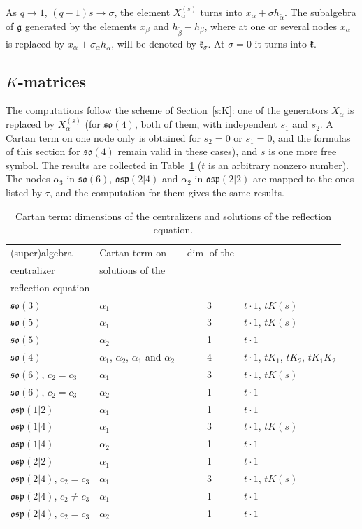 \documentclass[12pt,a4paper]{article}
\makeatletter
\newcommand{\g}{\mathfrak{g}}
\newcommand{\kk}{\mathfrak{k}}
\newcommand{\so}{\mathfrak{so}}
\newcommand{\osp}{\mathfrak{osp}}
\newcommand{\ta}{\tilde\alpha}
\newcommand{\hd}[2][c]{\tabular[b]{@{}#1@{}}#2\endtabular}
\makeatother
\begin{document}
As $q\to1$, $(q-1)s\to\sigma$, the element $X^{(s)}_\alpha$ turns into $x_\alpha+\sigma h_{\ta}$. The subalgebra of $\g$
generated by the elements $x_\beta$ and $h_{\tilde\beta}-h_\beta$, where at one or several nodes $x_\alpha$
is replaced by $x_\alpha+\sigma_\alpha h_{\ta}$, will be denoted by $\kk_\sigma$. At $\sigma=0$ it turns into $\kk$.


\subsection{$K$-matrices}\label{ss:Ks}
The computations follow the scheme of Section~\ref{s:K}: one of the generators $X_\alpha$ is replaced by $X^{(s)}_\alpha$ (for
$\so(4)$, both of them, with independent $s_1$ and $s_2$. A Cartan term on one node only is obtained for $s_2=0$ or $s_1=0$, and the formulas of this section for $\so(4)$ remain valid in these cases), and $s$ is one more free symbol. The results are collected in
Table~\ref{t:resS} ($t$ is an arbitrary nonzero number). The nodes $\alpha_3$ in $\so(6)$, $\osp(2|4)$ and $\alpha_2$ in $\osp(2|2)$ are mapped to the ones listed by
$\tau$, and the computation for them gives the same results.

\begin{table}[H]
\centering\small
\setlength{\tabcolsep}{4pt}
\begin{tabular}{@{}llcl@{}}
\toprule
(super)algebra & Cartan term on & \hd{$\dim$ of the\\ centralizer} & \hd[l]{solutions of the\\ reflection equation}\\
\midrule
$\so(3)$ & $\alpha_1$ & 3 & $t\cdot1$, $tK(s)$\\
$\so(5)$ & $\alpha_1$ & 3 & $t\cdot1$, $tK(s)$\\
$\so(5)$ & $\alpha_2$ & 1 & $t\cdot1$\\
$\so(4)$ & $\alpha_1$, $\alpha_2$, $\alpha_1$ and $\alpha_2$ & 4 & $t\cdot1$, $tK_1$, $tK_2$, $tK_1K_2$\\
$\so(6)$, $c_2=c_3$ & $\alpha_1$ & 3 & $t\cdot1$, $tK(s)$\\
$\so(6)$, $c_2=c_3$ & $\alpha_2$ & 1 & $t\cdot1$\\
$\osp(1|2)$ & $\alpha_1$ & 1 & $t\cdot1$\\
$\osp(1|4)$ & $\alpha_1$ & 3 & $t\cdot1$, $tK(s)$\\
$\osp(1|4)$ & $\alpha_2$ & 1 & $t\cdot1$\\
$\osp(2|2)$ & $\alpha_1$ & 1 & $t\cdot1$\\
$\osp(2|4)$, $c_2=c_3$ & $\alpha_1$ & 3 & $t\cdot1$, $tK(s)$\\
$\osp(2|4)$, $c_2\neq c_3$ & $\alpha_1$ & 1 & $t\cdot1$\\
$\osp(2|4)$, $c_2=c_3$ & $\alpha_2$ & 1 & $t\cdot1$\\
\bottomrule
\end{tabular}
\caption{Cartan term: dimensions of the centralizers and solutions of the reflection equation.}\label{t:resS}
\end{table}
\end{document}
